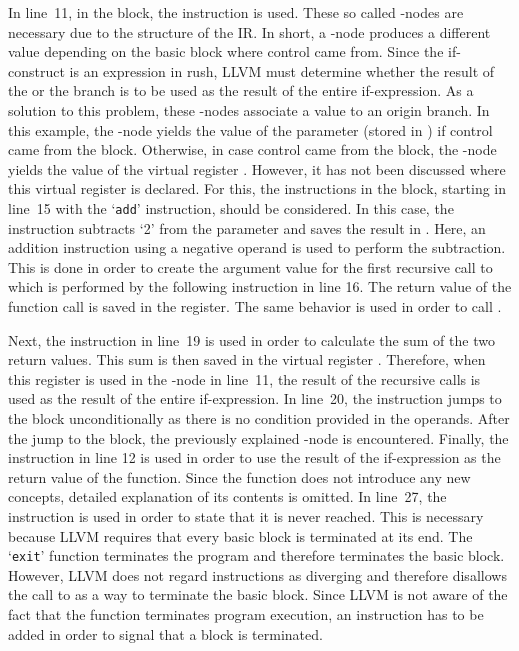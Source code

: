 In line~11, in the  block, the  instruction is used.
These so called \phi-nodes are necessary due to the structure of the IR\@.
In short, a \phi-node produces a different value depending on the basic block where control came from.
Since the if-construct is an expression in rush, LLVM must determine whether the result of the  or the  branch is to be used as the result of the entire if-expression.
As a solution to this problem, these \phi-nodes associate a value to an origin branch.
In this example, the \phi-node yields the value of the parameter  (stored in ) if control came from the  block.
Otherwise, in case control came from the  block, the \phi-node yields the value of the virtual register .
However, it has not been discussed where this virtual register is declared.
For this, the instructions in the  block, starting in line~15 with the `\texttt{add}' instruction, should be considered.
In this case, the instruction subtracts `2' from the parameter  and saves the result in .
Here, an addition instruction using a negative operand is used to perform the subtraction.
This is done in order to create the argument value for the first recursive call to  which is performed by the following  instruction in line 16.
The return value of the function call is saved in the  register.
The same behavior is used in order to call .

Next, the  instruction in line~19 is used in order to calculate the sum of the two return values.
This sum is then saved in the virtual register .
Therefore, when this register is used in the \phi-node in line~11, the result of the recursive calls is used as the result of the entire if-expression.
In line~20, the  instruction jumps to the  block unconditionally as there is no condition provided in the operands.
After the jump to the  block, the previously explained \phi-node is encountered.
Finally, the  instruction in line 12 is used in order to use the result of the if-expression as the return value of the function.
Since the  function does not introduce any new concepts, detailed explanation of its contents is omitted.
In line~27, the  instruction is used in order to state that it is never reached.
This is necessary because LLVM requires that every basic block is terminated at its end.
The `\texttt{exit}' function terminates the program and therefore terminates the basic block.
However, LLVM does not regard  instructions as diverging and therefore disallows the call to  as a way to terminate the basic block.
Since LLVM is not aware of the fact that the  function terminates program execution,
an  instruction has to be added in order to signal that a block is terminated.

